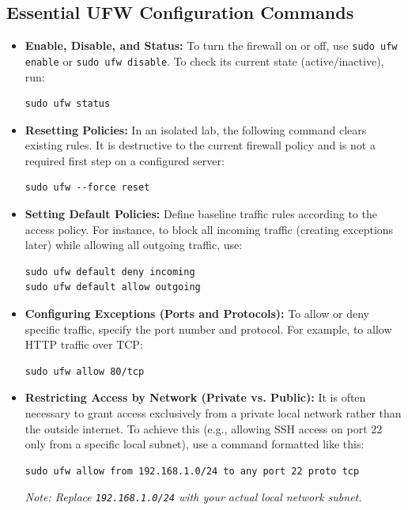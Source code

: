\documentclass[journal]{IEEEtran}
\begin{document}
\subsection{Essential UFW Configuration Commands}

\begin{itemize}

    \item \textbf{Enable, Disable, and Status:}
    To turn the firewall on or off, use \texttt{sudo ufw enable} or \texttt{sudo ufw disable}. To check its current state (active/inactive), run:
    \begin{lstlisting}
sudo ufw status
    \end{lstlisting}

    \item \textbf{Resetting Policies:}
    In an isolated lab, the following command clears existing rules. It is destructive to the current firewall policy and is not a required first step on a configured server:
    \begin{lstlisting}
sudo ufw --force reset
    \end{lstlisting}

    \item \textbf{Setting Default Policies:}
    Define baseline traffic rules according to the access policy. For instance, to block all incoming traffic (creating exceptions later) while allowing all outgoing traffic, use:
    \begin{lstlisting}
sudo ufw default deny incoming
sudo ufw default allow outgoing
    \end{lstlisting}

    \item \textbf{Configuring Exceptions (Ports and Protocols):}
    To allow or deny specific traffic, specify the port number and protocol. For example, to allow HTTP traffic over TCP:
    \begin{lstlisting}
sudo ufw allow 80/tcp
    \end{lstlisting}

    \item \textbf{Restricting Access by Network (Private vs. Public):}
    It is often necessary to grant access exclusively from a private local network rather than the outside internet. To achieve this (e.g., allowing SSH access on port 22 only from a specific local subnet), use a command formatted like this:
    \begin{lstlisting}
sudo ufw allow from 192.168.1.0/24 to any port 22 proto tcp
    \end{lstlisting}
    \textit{Note: Replace \texttt{192.168.1.0/24} with your actual local network subnet.}

\end{itemize}
\end{document}
